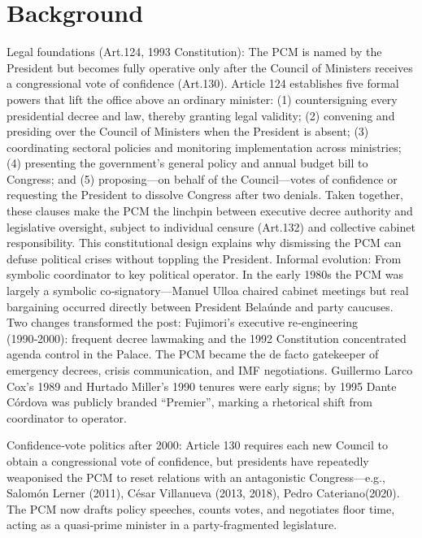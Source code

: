 \documentclass[a4paper, 12pt]{article}
\begin{document}
\section{Background}\label{explo-tables} %

Legal foundations (Art.124, 1993 Constitution): The PCM is named by the President but becomes fully operative only after the Council of Ministers receives a congressional vote of confidence (Art.130). Article 124 establishes five formal powers that lift the office above an ordinary minister: (1) countersigning every presidential decree and law, thereby granting legal validity; (2) convening and presiding over the Council of Ministers when the President is absent; (3) coordinating sectoral policies and monitoring implementation across ministries; (4) presenting the government’s general policy and annual budget bill to Congress; and (5) proposing—on behalf of the Council—votes of confidence or requesting the President to dissolve Congress after two denials. Taken together, these clauses make the PCM the linchpin between executive decree authority and legislative oversight, subject to individual censure (Art.132) and collective cabinet responsibility. This constitutional design explains why dismissing the PCM can defuse political crises without toppling the President.
Informal evolution: From symbolic coordinator to key political operator. In the early 1980s the PCM was largely a symbolic co‑signatory—Manuel Ulloa chaired cabinet meetings but real bargaining occurred directly between President Belaúnde and party caucuses. Two changes transformed the post:
Fujimori’s executive re‑engineering (1990‑2000): frequent decree lawmaking and the 1992 Constitution concentrated agenda control in the Palace. The PCM became the de facto gatekeeper of emergency decrees, crisis communication, and IMF negotiations. Guillermo Larco Cox’s 1989 and Hurtado Miller’s 1990 tenures were early signs; by 1995 Dante Córdova was publicly branded “Premier”, marking a rhetorical shift from coordinator to operator.

Confidence‑vote politics after 2000: Article 130 requires each new Council to obtain a congressional vote of confidence, but presidents have repeatedly weaponised the PCM to reset relations with an antagonistic Congress—e.g., Salomón Lerner (2011), César Villanueva (2013, 2018), Pedro Cateriano(2020). The PCM now drafts policy speeches, counts votes, and negotiates floor time, acting as a quasi‑prime minister in a party‑fragmented legislature.
\end{document}
